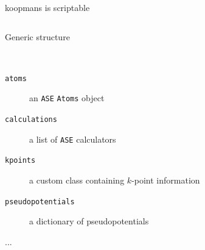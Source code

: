 \documentclass[xcolor=table,aspectratio=169]{beamer}
\numberwithin{equation}{section}
\begin{document}

\begin{frame}{koopmans is scriptable}
   \vspace{-2ex}
   \inputminted[fontsize=\scriptsize,breaklines]{python}{scripts/si.py}
\end{frame}

\begin{frame}{Generic structure}

   \begin{description}[<+->]
      \item[\texttt{Workflow}] \vphantom{x}\\
    \begin{description}
       \item[\texttt{atoms}] an \texttt{ASE} \texttt{Atoms} object
       \item[\texttt{calculations}] a list of \texttt{ASE} calculators 
       \item[\texttt{kpoints}] a custom class containing $k$-point information
       \item[\texttt{pseudopotentials}] a dictionary of pseudopotentials
       \item[...] 
    \end{description}
   \end{description}

   
\end{frame}
\end{document}
